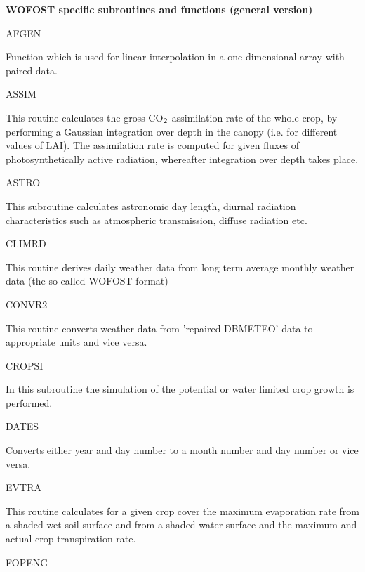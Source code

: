 \bigskip
\bigskip
\bigskip
\bigskip
\bigskip
\bigskip
\bigskip
\bigskip
{\bf {\large WOFOST specific subroutines and functions (general version)}}

AFGEN
\testlastline

\begin{indenting}{2.54cm}
Function which is used for linear interpola\-tion in a one-di\-mensi\-onal array
with paired data.
\end{indenting}
ASSIM
\testlastline

\begin{indenting}{2.54cm}
This routine calculates the gross CO$_{{\rm 2}}$ assimilation rate of the whole crop,
by performing a Gaussian integration over depth in the canopy (i.e. for
different values of LAI). The assimilation rate is computed for given fluxes
of photosynthetically active radiation, whereafter integra\-tion over depth
takes place.
\end{indenting}
ASTRO
\testlastline

\begin{indenting}{2.54cm}
This subroutine calculates astronomic day length, diurnal radiation charac\-teristics such as atmospheric transmission, diffuse radiation etc. 
\end{indenting}
CLIMRD
\testlastline

\begin{indenting}{2.54cm}
This routine derives daily weather data from long term average monthly
weather data (the so called WOFOST format)
\end{indenting}
CONVR2
\testlastline

\begin{indenting}{2.54cm}
This routine converts weather data from 'repaired DBMETEO' data to
appropriate units and vice versa. 
\end{indenting}
CROPSI
\testlastline

\begin{indenting}{2.54cm}
In this subroutine the simulation of the potential or water limited crop
growth is performed.
\end{indenting}
DATES
\testlastline

\begin{indenting}{2.54cm}
Converts either year and day number to a month number and day number
or vice versa.
\end{indenting}
EVTRA
\testlastline

\begin{indenting}{2.54cm}
This routine calculates for a given crop cover the maximum evaporation
rate from a shaded wet soil surface and from a shaded water surface and
the maximum and actual crop transpiration rate.
\end{indenting}
FOPENG
\testlastline

